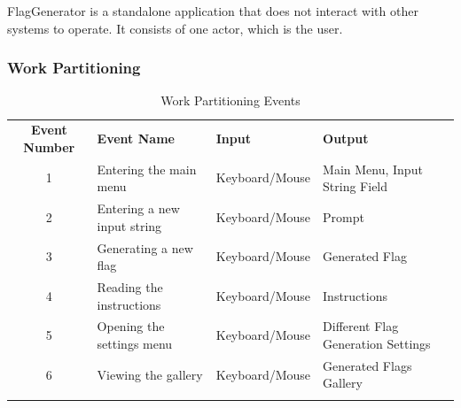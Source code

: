 \documentclass[12pt, titlepage]{article}
\begin{document}
\noindent FlagGenerator is a standalone application that does not interact with other systems to operate. It consists of one actor, which is the user.

\pagebreak

\subsubsection{Work Partitioning}

\begin{table}[h!]
    \centering
    \caption{Work Partitioning Events}
    \begin{tabularx}{\textwidth}{|c|X|X|X|}
        \hhline{|-|-|-|-|}
        \textbf{Event Number} & \textbf{Event Name} & \textbf{Input} & \textbf{Output} \\
        \hhline{|-|-|-|-|}
        1 & Entering the main menu & Keyboard/Mouse & Main Menu, Input String Field \\
        \hhline{|-|-|-|-|}
        2 & Entering a new input string & Keyboard/Mouse & Prompt \\
        \hhline{|-|-|-|-|}
        3 & Generating a new flag & Keyboard/Mouse & Generated Flag \\
        \hhline{|-|-|-|-|}
        4 & Reading the instructions & Keyboard/Mouse & Instructions \\
        \hhline{|-|-|-|-|}
        5 & Opening the settings menu & Keyboard/Mouse & Different Flag Generation Settings \\
        \hhline{|-|-|-|-|}
        6 & Viewing the gallery & Keyboard/Mouse & Generated Flags Gallery \\
        \hhline{|-|-|-|-|}
    \end{tabularx}
\end{table}
\end{document}

